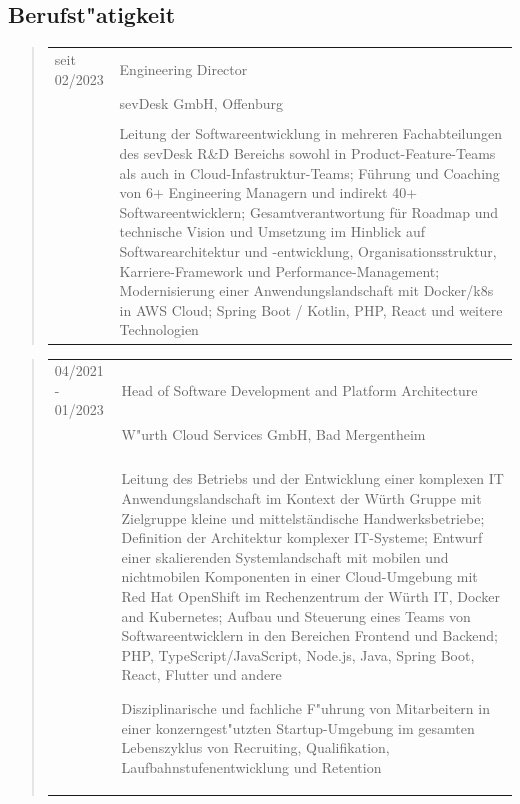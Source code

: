 \subsection*{Berufst"atigkeit}
	\begin{quote}
		\begin{tabular}{p{4cm}l}
			seit 02/2023&Engineering Director\\
			&sevDesk GmbH, Offenburg\\
			\\
			&\begin{minipage}{10cm}
				Leitung der Softwareentwicklung in mehreren Fachabteilungen des sevDesk R\&D Bereichs sowohl in Product-Feature-Teams 
				als auch in Cloud-Infastruktur-Teams; Führung und Coaching von 6+ Engineering Managern und indirekt 40+ Softwareentwicklern; 
				Gesamtverantwortung für Roadmap und technische Vision und Umsetzung im Hinblick auf 
				Softwarearchitektur und -entwicklung, Organisationsstruktur, Karriere-Framework und Performance-Management;
				Modernisierung einer  Anwendungslandschaft mit Docker/k8s in AWS Cloud; Spring Boot / Kotlin, 
				PHP, React und weitere Technologien
			\end{minipage}
		\end{tabular}
	\end{quote}
	\begin{quote}
		\begin{tabular}{p{4cm}l}
			04/2021 - 01/2023&Head of Software Development and Platform Architecture\\
			&W"urth Cloud Services GmbH, Bad Mergentheim\\
			\\
			&\begin{minipage}{10cm}
				Leitung des Betriebs und der Entwicklung einer komplexen IT Anwendungslandschaft im Kontext der Würth Gruppe mit Zielgruppe 
				kleine und mittelständische Handwerksbetriebe; Definition der Architektur komplexer IT-Systeme; Entwurf einer skalierenden 				Systemlandschaft mit mobilen und nichtmobilen Komponenten in einer Cloud-Umgebung mit Red Hat OpenShift im Rechenzentrum der Würth IT, Docker 
				and Kubernetes; Aufbau und Steuerung eines Teams von Softwareentwicklern in den Bereichen Frontend und Backend; 
				PHP, TypeScript/JavaScript, Node.js, Java, Spring Boot, React, Flutter und andere\newline
						
				Disziplinarische und fachliche F"uhrung von Mitarbeitern in einer 
				konzerngest"utzten Startup-Umgebung im gesamten Lebenszyklus von Recruiting, Qualifikation, 
				Laufbahnstufenentwicklung und Retention%
			\end{minipage}
		\end{tabular}
	\end{quote}
